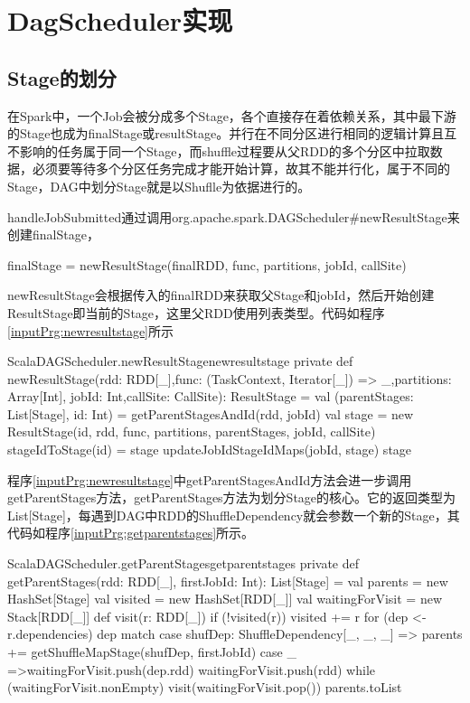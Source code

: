 \section{DagScheduler实现}
\subsection{Stage的划分}

在Spark中，一个Job会被分成多个Stage，各个直接存在着依赖关系，其中最下游的Stage也成为finalStage或resultStage。并行在不同分区进行相同的逻辑计算且互不影响的任务属于同一个Stage，而shuffle过程要从父RDD的多个分区中拉取数据，必须要等待多个分区任务完成才能开始计算，故其不能并行化，属于不同的Stage，DAG中划分Stage就是以Shuflle为依据进行的。

handleJobSubmitted通过调用org.apache.spark.DAGScheduler\#newResultStage来创建finalStage，
\begin{orgianlboxnotitle}
	finalStage = newResultStage(finalRDD, func, partitions, jobId, callSite)
\end{orgianlboxnotitle}

newResultStage会根据传入的finalRDD来获取父Stage和jobId，然后开始创建ResultStage即当前的Stage，这里父RDD使用列表类型。代码如程序\ref{inputPrg:newresultstage}所示
\begin{codeInput}{Scala}{DAGScheduler.newResultStage}{newresultstage}
private def newResultStage(rdd: RDD[_],func: (TaskContext, Iterator[_]) => _,partitions: Array[Int],
jobId: Int,callSite: CallSite): ResultStage = {
  val (parentStages: List[Stage], id: Int) = getParentStagesAndId(rdd, jobId)
  val stage = new ResultStage(id, rdd, func, partitions, parentStages, jobId, callSite)
  stageIdToStage(id) = stage
  updateJobIdStageIdMaps(jobId, stage)
  stage
}
\end{codeInput}

程序\ref{inputPrg:newresultstage}中getParentStagesAndId方法会进一步调用getParentStages方法，getParentStages方法为划分Stage的核心。它的返回类型为List[Stage]，每遇到DAG中RDD的ShuffleDependency就会参数一个新的Stage，其代码如程序\ref{inputPrg:getparentstages}所示。
\begin{codeInput}{Scala}{DAGScheduler.getParentStages}{getparentstages}
private def getParentStages(rdd: RDD[_], firstJobId: Int): List[Stage] = {
  val parents = new HashSet[Stage]
  val visited = new HashSet[RDD[_]]
  val waitingForVisit = new Stack[RDD[_]]
  def visit(r: RDD[_]) {
    if (!visited(r)) {
      visited += r
      for (dep <- r.dependencies) {
        dep match {
          case shufDep: ShuffleDependency[_, _, _] =>
            parents += getShuffleMapStage(shufDep, firstJobId)
          case _ =>waitingForVisit.push(dep.rdd)
        }
      }
    }
  }
  waitingForVisit.push(rdd)
  while (waitingForVisit.nonEmpty) {
    visit(waitingForVisit.pop())
  }
  parents.toList
}
\end{codeInput}

